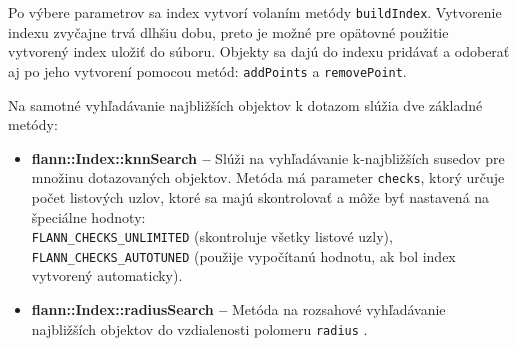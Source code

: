 \documentclass[12pt,a4paper,oneside]{fithesis2}
\begin{document}
Po výbere parametrov sa index vytvorí volaním metódy \texttt{buildIndex}. Vytvorenie indexu zvyčajne trvá dlhšiu dobu, preto je možné pre opätovné použitie vytvorený index uložiť do súboru.
Objekty sa dajú do indexu pridávať a odoberať aj po jeho vytvorení pomocou metód: \texttt{addPoints} a \texttt{removePoint}. 

Na samotné vyhľadávanie najbližších objektov k dotazom slúžia dve základné metódy:

\begin{itemize}
	\item \textbf{flann::Index::knnSearch --} Slúži na vyhľadávanie k-najbližších susedov pre množinu dotazovaných objektov. Metóda má parameter \texttt{checks}, ktorý určuje počet listových uzlov, ktoré sa majú skontrolovať a môže byť nastavená na špeciálne hodnoty:\\ \texttt{FLANN\_CHECKS\_UNLIMITED} (skontroluje všetky listové uzly),\\ \texttt{FLANN\_CHECKS\_AUTOTUNED} (použije vypočítanú hodnotu, ak bol index vytvorený automaticky).

	\item \textbf{flann::Index::radiusSearch --} Metóda na rozsahové vyhľadávanie najbližších objektov do vzdialenosti polomeru \texttt{radius} \cite{manual}. 

\end{itemize}

		
\end{document}
